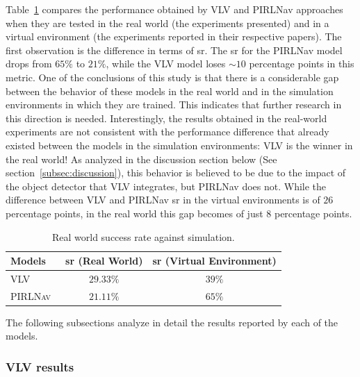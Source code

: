 Table~\ref{tab:results_sota} compares the performance obtained by VLV and PIRLNav approaches when they are tested in the real world (\ie the experiments presented) and in a virtual environment (\ie the experiments reported in their respective papers).
The first observation is the difference in terms of \acrshort{sr}\@.
The \acrshort{sr} for the PIRLNav model drops from $65\%$ to $21\%$, while the VLV model loses $\sim10$ percentage points in this metric.
One of the conclusions of this study is that there is a considerable gap between the behavior of these models in the real world and in the simulation environments in which they are trained.
This indicates that further research in this direction is needed.
Interestingly, the results obtained in the real-world experiments are not consistent with the performance difference that already existed between the models in the simulation environments: VLV is the winner in the real world!
As analyzed in the discussion section below (See section~\ref{subsec:discussion}), this behavior is believed to be due to the impact of the object detector that VLV integrates, but PIRLNav does not.
While the difference between VLV and PIRLNav \acrshort{sr} in the virtual environments is of $26$ percentage points, in the real world this gap becomes of just $8$ percentage points.

\begin{table}
    \centering
    \begin{tabular}{l|cc}
        \toprule
        \textbf{Models}                       & \acrshort{sr} (Real World) & \acrshort{sr} (Virtual Environment) \\
        \midrule
        \textsc{VLV}~\cite{chang2020}         & $29.33\%$                  & $39\%$                              \\
        \textsc{PIRLNav}~\cite{ramrakhya2023} & $21.11\%$                  & $65\%$                              \\
        \bottomrule
    \end{tabular}
    \caption{Real world success rate against simulation.}
    \label{tab:results_sota}
\end{table}

The following subsections analyze in detail the results reported by each of the models.

\subsubsection{VLV results}
\label{subsubsec:vlv_results}


